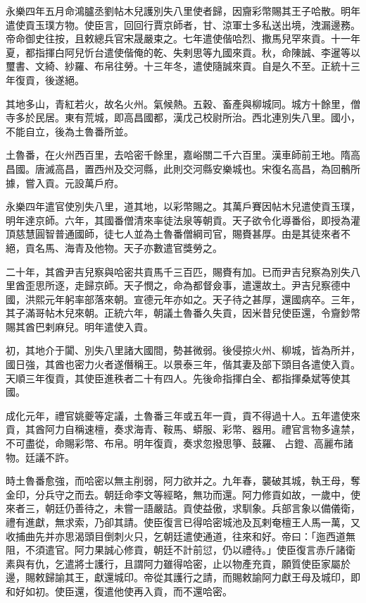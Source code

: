 \begin{pinyinscope}
永樂四年五月命鴻臚丞劉帖木兒護別失八里使者歸，因齎彩幣賜其王子哈散。明年遣使貢玉璞方物。使臣言，回回行賈京師者，甘、涼軍士多私送出境，洩漏邊務。帝命御史往按，且敕總兵官宋晟嚴束之。七年遣使偕哈烈、撒馬兒罕來貢。十一年夏，都指揮白阿兒忻台遣使偕俺的乾、失剌思等九國來貢。秋，命陳誠、李暹等以璽書、文綺、紗羅、布帛往勞。十三年冬，遣使隨誠來貢。自是久不至。正統十三年復貢，後遂絕。

其地多山，青紅若火，故名火州。氣候熱。五穀、畜產與柳城同。城方十餘里，僧寺多於民居。東有荒城，即高昌國都，漢戊己校尉所治。西北連別失八里。國小，不能自立，後為土魯番所並。

土魯番，在火州西百里，去哈密千餘里，嘉峪關二千六百里。漢車師前王地。隋高昌國。唐滅高昌，置西州及交河縣，此則交河縣安樂城也。宋復名高昌，為回鶻所據，嘗入貢。元設萬戶府。

永樂四年遣官使別失八里，道其地，以彩幣賜之。其萬戶賽因帖木兒遣使貢玉璞，明年達京師。六年，其國番僧清來率徒法泉等朝貢。天子欲令化導番俗，即授為灌頂慈慧圓智普通國師，徒七人並為土魯番僧綱司官，賜賚甚厚。由是其徒來者不絕，貢名馬、海青及他物。天子亦數遣官獎勞之。

二十年，其酋尹吉兒察與哈密共貢馬千三百匹，賜賚有加。已而尹吉兒察為別失八里酋歪思所逐，走歸京師。天子憫之，命為都督僉事，遣還故土。尹吉兒察德中國，洪熙元年躬率部落來朝。宣德元年亦如之。天子待之甚厚，還國病卒。三年，其子滿哥帖木兒來朝。正統六年，朝議土魯番久失貢，因米昔兒使臣還，令齎鈔幣賜其酋巴剌麻兒。明年遣使入貢。

初，其地介于闐、別失八里諸大國間，勢甚微弱。後侵掠火州、柳城，皆為所并，國日強，其酋也密力火者遂僭稱王。以景泰三年，偕其妻及部下頭目各遣使入貢。天順三年復貢，其使臣進秩者二十有四人。先後命指揮白全、都指揮桑斌等使其國。

成化元年，禮官姚夔等定議，土魯番三年或五年一貢，貢不得過十人。五年遣使來貢，其酋阿力自稱速檀，奏求海青、鞍馬、蟒服、彩幣、器用。禮官言物多違禁，不可盡從，命賜彩幣、布帛。明年復貢，奏求忽撥思箏、鼓羅、占鐙、高麗布諸物。廷議不許。

時土魯番愈強，而哈密以無主削弱，阿力欲并之。九年春，襲破其城，執王母，奪金印，分兵守之而去。朝廷命李文等經略，無功而還。阿力修貢如故，一歲中，使來者三，朝廷仍善待之，未嘗一語嚴詰。貢使益傲，求馴象。兵部言象以備儀衛，禮有進獻，無求索，乃卻其請。使臣復言已得哈密城池及瓦剌奄檀王人馬一萬，又收捕曲先并亦思渴頭目倒刺火只，乞朝廷遣使通道，往來和好。帝曰：「迤西道無阻，不須遣官。阿力果誠心修貢，朝廷不計前愆，仍以禮待。」使臣復言赤斤諸衛素與有仇，乞遣將士護行，且謂阿力雖得哈密，止以物產充貢，願質使臣家屬於邊，賜敕歸諭其王，獻還城印。帝從其護行之請，而賜敕諭阿力獻王母及城印，即和好如初。使臣還，復遣他使再入貢，而不還哈密。


\end{pinyinscope}
